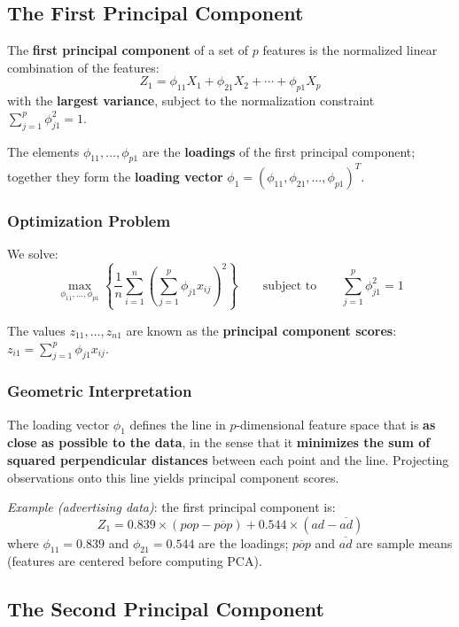 \documentclass[11pt,a4paper]{article}
\theoremstyle{definition}
\theoremstyle{plain}
\theoremstyle{remark}
\begin{document}
\subsection{The First Principal Component}

The \textbf{first principal component} of a set of $p$ features is the normalized linear combination of the features:
\[
    Z_1 = \phi_{11} X_1 + \phi_{21} X_2 + \cdots + \phi_{p1} X_p
\]
with the \textbf{largest variance}, subject to the normalization constraint $\sum_{j=1}^{p} \phi_{j1}^2 = 1$.

The elements $\phi_{11}, \ldots, \phi_{p1}$ are the \textbf{loadings} of the first principal component; together they form the \textbf{loading vector} $\phi_1 = (\phi_{11}, \phi_{21}, \ldots, \phi_{p1})^T$.

\subsubsection{Optimization Problem}

We solve:
\[
    \max_{\phi_{11},\ldots,\phi_{p1}} \left\{ \frac{1}{n} \sum_{i=1}^{n} \left( \sum_{j=1}^{p} \phi_{j1} x_{ij} \right)^2 \right\}
    \qquad \text{subject to} \qquad
    \sum_{j=1}^{p} \phi_{j1}^2 = 1
\]

The values $z_{11}, \ldots, z_{n1}$ are known as the \textbf{principal component scores}: $z_{i1} = \sum_{j=1}^p \phi_{j1} x_{ij}$.

\subsubsection{Geometric Interpretation}

The loading vector $\phi_1$ defines the line in $p$-dimensional feature space that is \textbf{as close as possible to the data}, in the sense that it \textbf{minimizes the sum of squared perpendicular distances} between each point and the line. Projecting observations onto this line yields principal component scores.

\textit{Example (advertising data)}: the first principal component is:
\[
    Z_1 = 0.839 \times (\mathit{pop} - \overline{\mathit{pop}}) + 0.544 \times (\mathit{ad} - \overline{\mathit{ad}})
\]
where $\phi_{11} = 0.839$ and $\phi_{21} = 0.544$ are the loadings; $\overline{\mathit{pop}}$ and $\overline{\mathit{ad}}$ are sample means (features are centered before computing PCA).

\subsection{The Second Principal Component}
\end{document}
